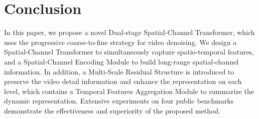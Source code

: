 \documentclass[journal]{IEEEtran}
\begin{document}
\section{Conclusion}
In this paper, we propose a novel Dual-stage Spatial-Channel Transformer, which uses the progressive coarse-to-fine strategy for video denoising. We design a Spatial-Channel Transformer to simultaneously capture spatio-temporal features, and a Spatial-Channel Encoding Module to build long-range spatial-channel information. In addition, a Multi-Scale Residual Structure is introduced to preserve the video detail information and enhance the representation on each level, which contains a Temporal Features Aggregation Module to summarize the dynamic representation. Extensive experiments on four public benchmarks demonstrate the effectiveness and superiority of the proposed method.



{
% 
}
\end{document}
